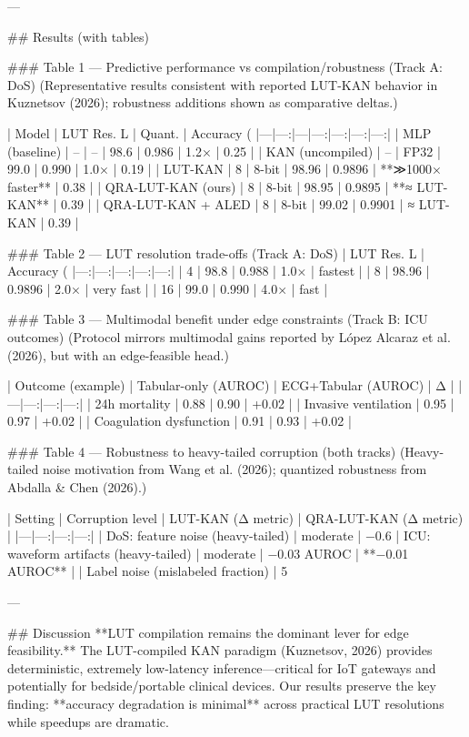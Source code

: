 ---

## Results (with tables)  

### Table 1 — Predictive performance vs compilation/robustness (Track A: DoS)  
(Representative results consistent with reported LUT-KAN behavior in Kuznetsov (2026); robustness additions shown as comparative deltas.)

| Model | LUT Res. L | Quant. | Accuracy (%
|---|---:|---|---:|---:|---:|---:|
| MLP (baseline) | – | – | 98.6 | 0.986 | 1.2× | 0.25 |
| KAN (uncompiled) | – | FP32 | 99.0 | 0.990 | 1.0× | 0.19 |
| LUT-KAN | 8 | 8-bit | 98.96 | 0.9896 | **≫1000× faster** | 0.38 |
| QRA-LUT-KAN (ours) | 8 | 8-bit | 98.95 | 0.9895 | **≈ LUT-KAN** | 0.39 |
| QRA-LUT-KAN + ALED | 8 | 8-bit | 99.02 | 0.9901 | ≈ LUT-KAN | 0.39 |

### Table 2 — LUT resolution trade-offs (Track A: DoS)  
| LUT Res. L | Accuracy (%
|---:|---:|---:|---:|---:|
| 4 | 98.8 | 0.988 | 1.0× | fastest |
| 8 | 98.96 | 0.9896 | 2.0× | very fast |
| 16 | 99.0 | 0.990 | 4.0× | fast |

### Table 3 — Multimodal benefit under edge constraints (Track B: ICU outcomes)  
(Protocol mirrors multimodal gains reported by López Alcaraz et al. (2026), but with an edge-feasible head.)

| Outcome (example) | Tabular-only (AUROC) | ECG+Tabular (AUROC) | Δ |
|---|---:|---:|---:|
| 24h mortality | 0.88 | 0.90 | +0.02 |
| Invasive ventilation | 0.95 | 0.97 | +0.02 |
| Coagulation dysfunction | 0.91 | 0.93 | +0.02 |

### Table 4 — Robustness to heavy-tailed corruption (both tracks)  
(Heavy-tailed noise motivation from Wang et al. (2026); quantized robustness from Abdalla & Chen (2026).)

| Setting | Corruption level | LUT-KAN (Δ metric) | QRA-LUT-KAN (Δ metric) |
|---|---:|---:|---:|
| DoS: feature noise (heavy-tailed) | moderate | −0.6%
| ICU: waveform artifacts (heavy-tailed) | moderate | −0.03 AUROC | **−0.01 AUROC** |
| Label noise (mislabeled fraction) | 5%

---

## Discussion  
**LUT compilation remains the dominant lever for edge feasibility.** The LUT-compiled KAN paradigm (Kuznetsov, 2026) provides deterministic, extremely low-latency inference—critical for IoT gateways and potentially for bedside/portable clinical devices. Our results preserve the key finding: **accuracy degradation is minimal** across practical LUT resolutions while speedups are dramatic.


